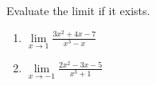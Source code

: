 Evaluate the limit if it exists.
\begin{enumerate}
\item $\displaystyle \lim\limits_{x\to 1} \frac{3x^2+4x-7}{x^3-x}$ 
\item $\displaystyle \lim\limits_{x\to -1} \frac{2x^2-3x-5}{x^3+1}$ 
\end{enumerate}
